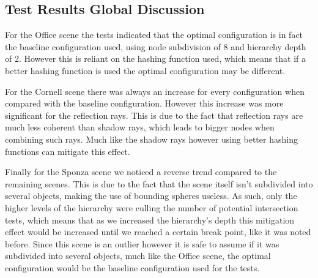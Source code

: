 
\subsection{Test Results Global Discussion}

For the Office scene the tests indicated that the optimal configuration is in fact the baseline configuration used, using node subdivision of 8 and hierarchy depth of 2. However this is reliant on the hashing function used, which means that if a better hashing function is used the optimal configuration may be different. 

For the Cornell scene there was always an increase for every configuration when compared with the baseline configuration. However this increase was more significant for the reflection rays. This is due to the fact that reflection rays are much less coherent than shadow rays, which leads to bigger nodes when combining such rays. Much like the shadow rays however using better hashing functions can mitigate this effect.

Finally for the Sponza scene we noticed a reverse trend compared to the remaining scenes. This is due to the fact that the scene itself isn't subdivided into several objects, making the use of bounding spheres useless. As such, only the higher levels of the hierarchy were culling the number of potential intersection tests, which means that as we increased the hierarchy's depth this mitigation effect would be increased until we reached a certain break point, like it was noted before. Since this scene is an outlier however it is safe to assume if it was subdivided into several objects, much like the Office scene, the optimal configuration would be the baseline configuration used for the tests. 